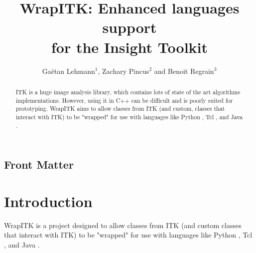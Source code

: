 \documentclass{InsightArticle}
\title{WrapITK: Enhanced languages support\\ for the Insight Toolkit}
\author{Ga\"etan Lehmann{$^1$}{\small{,}} Zachary Pincus{$^2$} {\small{and}} Benoit Regrain{$^3$}}
\begin{document}
\lstset{language=python}
\maketitle

\ifhtml
\chapter*{Front Matter\label{front}}
\fi

\begin{abstract}
\noindent
ITK \cite{ITKWebSite} is a huge image analysis library, which contains lots of state of the art
algorithms implementations. However, using it in C++ can be difficult and is
poorly suited for prototyping. WrapITK aims to allow classes from ITK
(and custom, classes that interact with ITK) to be "wrapped" for use with
languages like Python \cite{PythonWebSite}, Tcl \cite{TclWebSite}, and Java \cite{JavaWebSite}.
\end{abstract}

\tableofcontents

\newpage
\part{Introduction}

WrapITK is a project designed to allow classes from ITK (and custom classes
that interact with ITK) to be "wrapped" for use with languages like
Python \cite{PythonWebSite}, Tcl \cite{TclWebSite}, and Java \cite{JavaWebSite}.
\end{document}
